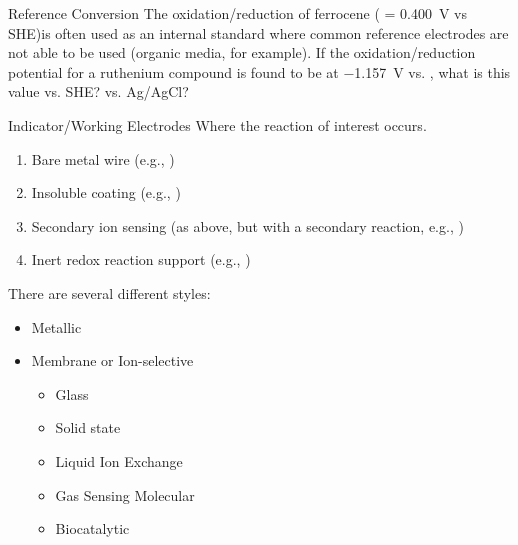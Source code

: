 \documentclass[notes=show]{beamer}
\begin{document}
\begin{frame}[t]{Reference Conversion}
	The oxidation/reduction of ferrocene ( =
	\SI{0.400}{\volt} vs SHE)\footnotemark is often used as an internal standard where
	common reference electrodes are not able to be used (organic media, for
	example). If the oxidation/reduction potential for a ruthenium compound
	is found to be at \SI{-1.157}{\volt} vs.
	, what
	is this value vs. SHE? vs. Ag/AgCl?

	\vfill


\end{frame}

\begin{frame}{Indicator/Working Electrodes}
	Where the reaction of interest occurs.

	\begin{enumerate}
		\item Bare metal wire (e.g., )
		\item Insoluble coating (e.g., )
		\item Secondary ion sensing (as above, but with a secondary
			reaction, e.g., )
		\item Inert redox reaction support (e.g., )
	\end{enumerate}

	There are several different styles:
	\begin{itemize}
		\item Metallic
		\item Membrane or Ion-selective
			\begin{itemize}
				\item Glass
				\item Solid state
				\item Liquid Ion Exchange
				\item Gas Sensing Molecular
				\item Biocatalytic
			\end{itemize}
	\end{itemize}
\end{frame}
\end{document}
